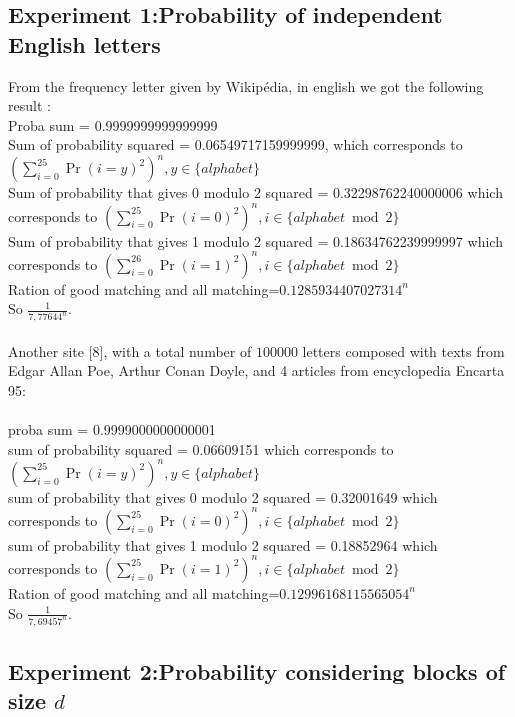 \documentclass{article}
\begin{document}
\subsection{Experiment 1:Probability of independent English letters}
From the frequency letter given by Wikip\'edia, in english we got the following result :\\
Proba sum = 0.9999999999999999\\
Sum of probability squared = 0.06549717159999999, which corresponds to $(\sum_{i=0}^{25}{\Pr(i=y)^2})^n, y \in \{alphabet\} $\\
Sum of probability that gives 0 modulo 2 squared  = 0.32298762240000006 which corresponds to $(\sum_{i=0}^{25}{\Pr(i=0)^2})^n, i \in \{alphabet \bmod 2\} $\\
Sum of probability that gives 1 modulo 2 squared = 0.18634762239999997 which corresponds to $(\sum_{i=0}^{26}{\Pr(i=1)^2})^n, i \in \{alphabet \bmod 2\} $\\
Ration of good matching and all matching=$0.1285934407027314^n$\\
So $\frac{1}{7,77644^n}$.
\\
\\
Another site [8], with a total number of $100000$ letters composed with texts from Edgar Allan Poe, Arthur Conan Doyle, and 4 articles from encyclopedia Encarta 95:\\
\\
proba sum = 0.9999000000000001\\
sum of probability squared = 0.06609151 which corresponds to $(\sum_{i=0}^{25}{\Pr(i=y)^2})^n, y \in \{alphabet\} $\\
sum of probability that gives 0 modulo 2 squared = 0.32001649 which corresponds to $(\sum_{i=0}^{25}{\Pr(i=0)^2})^n, i \in \{alphabet \bmod 2\} $\\
sum of probability that gives 1 modulo 2 squared = 0.18852964 which corresponds to $(\sum_{i=0}^{25}{\Pr(i=1)^2})^n, i \in \{alphabet \bmod 2\} $\\
Ration of good matching and all matching=$0.12996168115565054^n$\\
So $\frac{1}{7,69457^n}$.

\subsection{Experiment 2:Probability considering blocks of size $d$}
\end{document}
